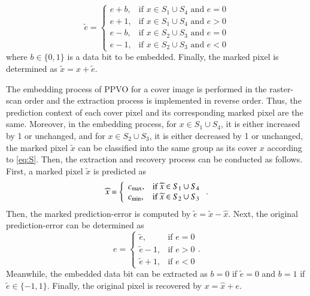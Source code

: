 \documentclass[review,3p,10pt,sort&compress]{elsarticle}
\begin{document}
\begin{equation}\label{eq:PPVOMPE}
    \widetilde{e} = \left\{\begin{array}{ll}
    e + b,  & \text{if } x \in S_1 \cup S_4 \text{ and } e = 0 \\
    e + 1,  & \text{if } x \in S_1 \cup S_4 \text{ and } e > 0 \\
    e - b,  & \text{if } x \in S_2 \cup S_3 \text{ and } e = 0 \\
    e - 1,  & \text{if } x \in S_2 \cup S_3 \text{ and } e < 0
\end{array}\right.
\end{equation}
where $b \in \{0,1\}$ is a data bit to be embedded. Finally, the marked pixel is determined as $\widetilde{x} = \widehat{x} + \widetilde{e}$.

The embedding process of PPVO for a cover image is performed in the raster-scan order and the extraction process is implemented in reverse order. Thus, the prediction context of each cover pixel and its corresponding marked pixel are the same. Moreover, in the embedding process, for $x \in S_1 \cup S_4$, it is either increased by 1 or unchanged, and for $x \in S_2 \cup S_3$, it is either decreased by 1 or unchanged, the marked pixel $\widetilde{x}$ can be classified into the same group as its cover $x$ according to \eqref{eq:S}. Then, the extraction and recovery process can be conducted as follows. First, a marked pixel $\widetilde{x}$ is predicted as
\begin{equation}\label{eq:xhat2}
    \widehat{x} = \left\{\begin{array}{ll}
    c_{\rm max},  & \text{if } \widetilde{x} \in S_1 \cup S_4 \\
    c_{\rm min},  & \text{if } \widetilde{x} \in S_2 \cup S_3
\end{array}\right.
.
\end{equation}
Then, the marked prediction-error is computed by $\widetilde{e} = \widetilde{x} - \widehat{x}$. Next, the original prediction-error can be determined as
\begin{equation}\label{eq:dPPVOMPE}
e = \left\{\begin{array}{ll}
\widetilde{e},      & \text{if } e = 0      \\
\widetilde{e} - 1,  & \text{if } e > 0   \\
\widetilde{e} + 1,  & \text{if } e < 0
\end{array}\right..
\end{equation}
Meanwhile, the embedded data bit can be extracted as $b = 0$ if $\widetilde{e} = 0$ and $b = 1$ if $\widetilde{e} \in \{-1, 1\}$. Finally, the original pixel is recovered by $x = \widehat{x} + e$.
\end{document}
